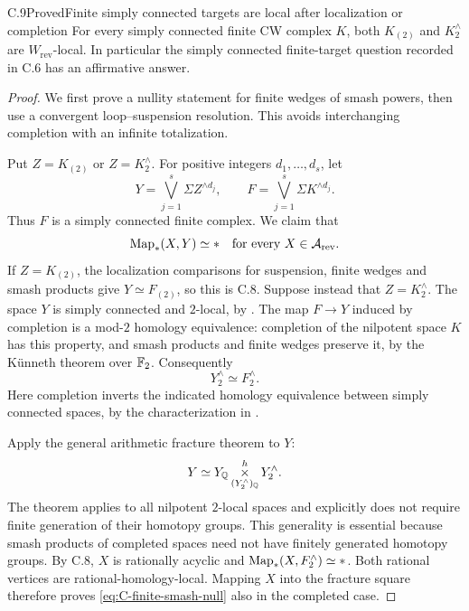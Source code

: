 \begin{claim}{C.9}{Proved}{Finite simply connected targets are local after localization or completion}
For every simply connected finite CW complex $K$, both $K_{(2)}$ and $K^{\wedge}_2$ are $W_{\mathrm{rev}}$-local. In particular the simply connected finite-target question recorded in C.6 has an affirmative answer.
\end{claim}
\begin{proof}
We first prove a nullity statement for finite wedges of smash powers, then use a convergent loop--suspension resolution. This avoids interchanging completion with an infinite totalization.

Put $Z=K_{(2)}$ or $Z=K^{\wedge}_2$. For positive integers $d_1,\ldots,d_s$, let
\[
 Y=\bigvee_{j=1}^s\Sigma Z^{\wedge d_j},
 \qquad
 F=\bigvee_{j=1}^s\Sigma K^{\wedge d_j}.
\]
Thus $F$ is a simply connected finite complex. We claim that
\begin{equation}\label{eq:C-finite-smash-null}
 \operatorname{Map}_*(X,Y)\simeq *\quad
 \text{for every }X\in\mathcal A_{\mathrm{rev}}.
\end{equation}
If $Z=K_{(2)}$, the localization comparisons for suspension, finite wedges and smash products give $Y\simeq F_{(2)}$, so this is C.8. Suppose instead that $Z=K^{\wedge}_2$. The space $Y$ is simply connected and $2$-local, by \cite[Propositions 6.4.1, 6.4.2 and 6.4.6]{FGHMayPonto2012}. The map $F\to Y$ induced by completion is a mod-$2$ homology equivalence: completion of the nilpotent space $K$ has this property, and smash products and finite wedges preserve it, by the K\"unneth theorem over $\mathbb F_2$. Consequently
\[
 Y^{\wedge}_2\simeq F^{\wedge}_2.
\]
Here completion inverts the indicated homology equivalence between simply connected spaces, by the characterization in \cite[Theorems 11.1.1--11.1.2]{FGHMayPonto2012}.

Apply the general arithmetic fracture theorem
\cite[Theorem 13.1.4, p.~244]{FGHMayPonto2012} to $Y$:
\[
 Y\simeq Y_{\mathbb Q}\mathop{\times}\limits^h_{(Y^{\wedge}_2)_{\mathbb Q}}
                  Y^{\wedge}_2.
\]
The theorem applies to all nilpotent $2$-local spaces and explicitly does not require finite generation of their homotopy groups. This generality is essential because smash products of completed spaces need not have finitely generated homotopy groups. By C.8, $X$ is rationally acyclic and $\operatorname{Map}_*(X,F^{\wedge}_2)\simeq *$. Both rational vertices are rational-homology-local. Mapping $X$ into the fracture square therefore proves \eqref{eq:C-finite-smash-null} also in the completed case.


\end{proof}
